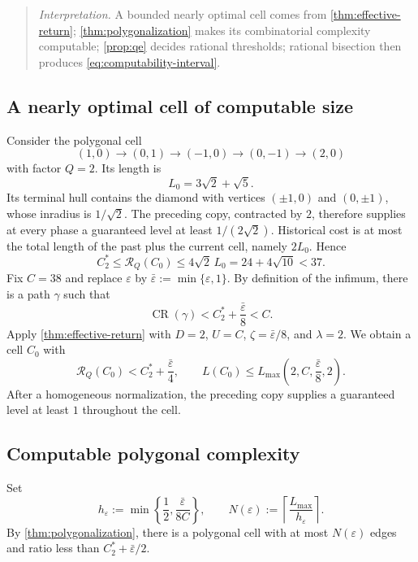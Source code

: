 \documentclass[10pt,a4paper]{article}
\theoremstyle{definition}
\theoremstyle{remark}
\DeclareMathOperator{\CR}{CR}
\newcommand{\cellratio}{\mathcal{R}}
\newcommand{\eps}{\varepsilon}
\begin{document}
\begin{quote}\small
\textit{Interpretation.} A bounded nearly optimal cell comes from \cref{thm:effective-return}; \cref{thm:polygonalization} makes its combinatorial complexity computable; \cref{prop:qe} decides rational thresholds; rational bisection then produces \eqref{eq:computability-interval}.
\end{quote}

\subsection{A nearly optimal cell of computable size}
Consider the polygonal cell
\begin{equation}
(1,0)\longrightarrow(0,1)\longrightarrow(-1,0)\longrightarrow(0,-1)\longrightarrow(2,0)
\label{eq:explicit-cell}
\end{equation}
with factor $Q=2$. Its length is
\[
L_0=3\sqrt2+\sqrt5.
\]
Its terminal hull contains the diamond with vertices $(\pm1,0)$ and $(0,\pm1)$, whose inradius is $1/\sqrt2$. The preceding copy, contracted by $2$, therefore supplies at every phase a guaranteed level at least $1/(2\sqrt2)$. Historical cost is at most the total length of the past plus the current cell, namely $2L_0$. Hence
\begin{equation}
C_2^*\le\cellratio_Q(C_0)
\le4\sqrt2\,L_0
=24+4\sqrt{10}<37.
\label{eq:crude-upper}
\end{equation}
Fix $C=38$ and replace $\eps$ by $\bar\eps:=\min\{\eps,1\}$. By definition of the infimum, there is a path $\gamma$ such that
\[
\CR(\gamma)<C_2^*+\frac{\bar\eps}{8}<C.
\]
Apply \cref{thm:effective-return} with $D=2$, $U=C$, $\zeta=\bar\eps/8$, and $\lambda=2$. We obtain a cell $C_0$ with
\begin{equation}
\cellratio_Q(C_0)<C_2^*+\frac{\bar\eps}{4},
\qquad
L(C_0)\le L_{\max}\left(2,C,\frac{\bar\eps}{8},2\right).
\label{eq:almost-optimal-cell}
\end{equation}
After a homogeneous normalization, the preceding copy supplies a guaranteed level at least $1$ throughout the cell.

\subsection{Computable polygonal complexity}
Set
\begin{equation}
h_\eps:=\min\left\{\frac12,\frac{\bar\eps}{8C}\right\},
\qquad
N(\eps):=\left\lceil\frac{L_{\max}}{h_\eps}\right\rceil.
\label{eq:N-eps}
\end{equation}
By \cref{thm:polygonalization}, there is a polygonal cell with at most $N(\eps)$ edges and ratio less than $C_2^*+\bar\eps/2$.
\end{document}
